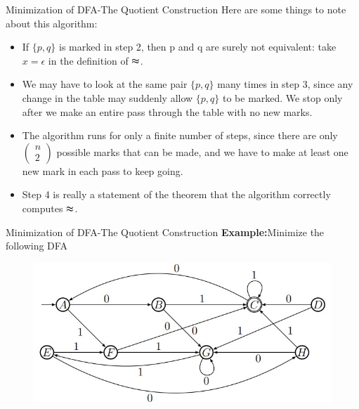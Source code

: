 \documentclass{beamer}
\begin{document}
\begin{frame}{Minimization of DFA-The Quotient Construction}
	Here are some things to note about this algorithm:
\begin{itemize}
	\item If $\{p, q\}$ is marked in step 2, then p and q are surely not equivalent: take
	$x = \epsilon$ in the definition of $\thickapprox$.
	\item We may have to look at the same pair $\{p, q\}$ many times in step 3, since
	any change in the table may suddenly allow $\{p, q\}$ to be marked. We stop
	only after we make an entire pass through the table with no new marks.
	\item The algorithm runs for only a finite number of steps, since there are only
	$\left( \begin{array}{c} n \\ 2 \end{array} \right)$
	possible marks that can be made, and we have to make at least one
	new mark in each pass to keep going.
	\item Step 4 is really a statement of the theorem that the algorithm correctly
	computes $ \thickapprox $.
\end{itemize}
\end{frame}
\begin{frame}{Minimization of DFA-The Quotient Construction}
\textbf{Example:}Minimize the following DFA
\begin{figure}
	\includegraphics[scale=.7]{img2/m13}
\end{figure}
\end{frame}
\end{document}
